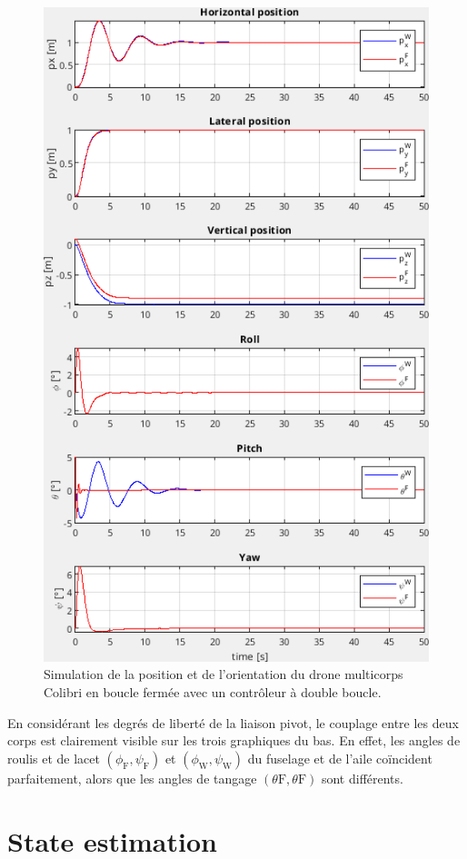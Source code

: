 \begin{figure}[ht!]
\centering
    \includegraphics[width=0.6\columnwidth,angle=0]{figures/colibri_sim.png}
    \caption{Simulation de la position et de l'orientation du drone multicorps Colibri en boucle fermée avec un contrôleur à double boucle. }
    \label{fig:sim_colibri}
\end{figure}

En considérant les degrés de liberté de la liaison pivot, le couplage entre les deux corps est clairement visible sur les trois graphiques du bas. En effet, les angles de roulis et de lacet $(\phi_{\text{F}}, \psi_{\text{F}})$ et $(\phi_{\text{W}}, \psi_{\text{W}})$ du fuselage et de l'aile coïncident parfaitement, alors que les angles de tangage $(\theta{\text{F}}, \theta{\text{F}})$ sont différents.








\section{State estimation}\label{sec:stateEst}

